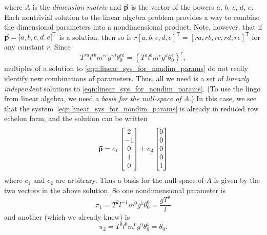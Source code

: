 where $A$ is the \emph{dimension matrix}
and  $\vec{\textbf{p}}$ is the vector of the powers
$a$, $b$, $c$, $d$, $e$.
Each nontrivial solution to the
linear algebra problem provides a way
to combine the dimensional parameters
into a nondimensional product.
Note, however, that if
$\vec{\textbf{p}} = \left[a,b,c,d,e\right]^{\textsf{T}}$ is a solution,
then so is $r\left[a,b,c,d,e\right]^{\textsf{T}} = \left[ra,rb,rc,rd,re\right]^{\textsf{T}}$
for any constant $r$.
Since
\begin{equation}
  T^{ra}l^{rb} m^{rc} g^{rd} \theta_0^{re}
   = \left(T^a l^b m^c g^d \theta_0^e\right)^r ,
\end{equation}
multiples of a solution to \eqref{eqn:linear_sys_for_nondim_params}
do not really identify new combinations of
parameters.
Thus, all we need is a set of
\emph{linearly independent} solutions
to \eqref{eqn:linear_sys_for_nondim_params}.
(To use the lingo from linear algebra, we need
a \emph{basis for the null-space of $A$}.)
In this case, we see that the system~\eqref{eqn:linear_sys_for_nondim_params}
is already in reduced row echelon form, and
the solution can be written
\begin{equation}
  \vec{\textbf{p}} = c_1\begin{bmatrix} 2 \\ -1 \\ 0 \\ 1 \\ 0 \end{bmatrix} +
      c_2 \begin{bmatrix} 0 \\ 0 \\ 0 \\ 0 \\ 1 \end{bmatrix} 
\end{equation}
where $c_1$ and $c_2$ are arbitrary.  Thus a basis for the
null-space of $A$ is
given by the two vectors in the above solution.
So one nondimensional parameter is
\begin{equation}
   \pi_1 = T^2 l^{-1} m^0 g^1 \theta_0^0
         = \frac{gT^2}{l}
\end{equation}
and another (which we already knew) is
\begin{equation}
   \pi_2 = T^0 l^0 m^0 g^0 \theta_0^1
         = \theta_0 .
\end{equation}


